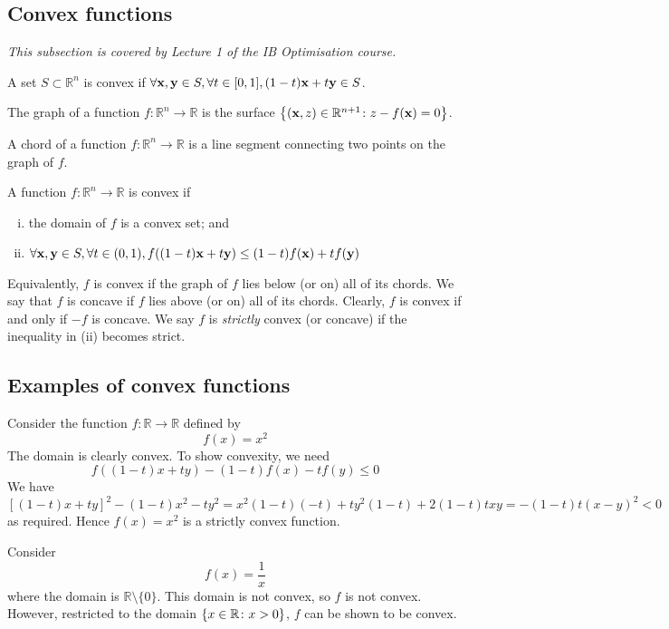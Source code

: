 \subsection{Convex functions}
\textit{This subsection is covered by Lecture 1 of the IB Optimisation course.}
\begin{definition}
	A set \( S \subset \mathbb R^n \) is convex if \( \forall \vb x, \vb y \in S, \forall t \in [0,1], (1-t)\vb x + t \vb y \in S \).
\end{definition}
\begin{definition}
	The graph of a function \( f \colon \mathbb R^n \to \mathbb R \) is the surface \( \qty{ (\vb x, z)\in \mathbb R^{n+1} \colon z - f(\vb x) = 0} \).
\end{definition}
\begin{definition}
	A chord of a function \( f \colon \mathbb R^n \to \mathbb R \) is a line segment connecting two points on the graph of \( f \).
\end{definition}
\begin{definition}
	A function \( f \colon \mathbb R^n \to \mathbb R \) is convex if
	\begin{enumerate}[(i)]
		\item the domain of \( f \) is a convex set; and
		\item \( \forall \vb x, \vb y \in S, \forall t \in (0,1), f((1-t)\vb x + t\vb y) \leq (1-t)f(\vb x) + tf(\vb y) \)
	\end{enumerate}
	Equivalently, \( f \) is convex if the graph of \( f \) lies below (or on) all of its chords.
	We say that \( f \) is concave if \( f \) lies above (or on) all of its chords.
	Clearly, \( f \) is convex if and only if \( -f \) is concave.
	We say \( f \) is \textit{strictly} convex (or concave) if the inequality in (ii) becomes strict.
\end{definition}

\subsection{Examples of convex functions}
\begin{example}
	Consider the function \( f \colon \mathbb R \to \mathbb R \) defined by
	\[
		f(x) = x^2
	\]
	The domain is clearly convex.
	To show convexity, we need
	\[
		f((1-t)x+ty) - (1-t)f(x) - tf(y) \leq 0
	\]
	We have
	\[
		[(1-t)x+ty]^2 - (1-t)x^2 - ty^2 = x^2(1-t)(-t) + ty^2(1-t) + 2(1-t)txy = -(1-t)t(x-y)^2 < 0
	\]
	as required.
	Hence \( f(x) = x^2 \) is a strictly convex function.
\end{example}
\begin{example}
	Consider
	\[
		f(x) = \frac{1}{x}
	\]
	where the domain is \( \mathbb R \setminus \{ 0 \} \).
	This domain is not convex, so \( f \) is not convex.
	However, restricted to the domain \( \qty{ x \in \mathbb R \colon x > 0 } \), \( f \) can be shown to be convex.
\end{example}


